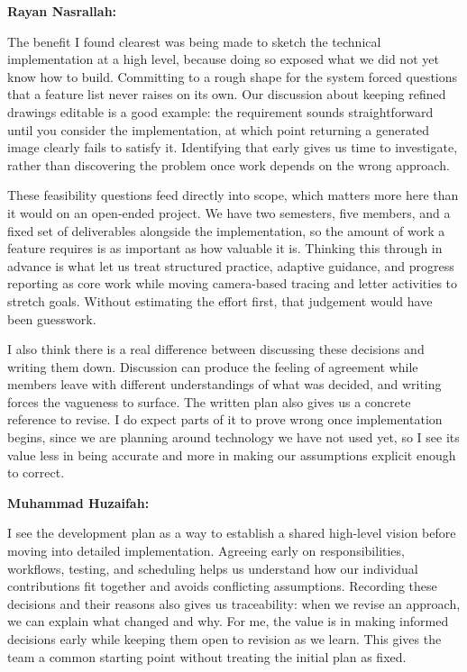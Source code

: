 \documentclass{article}
\begin{document}
\begin{enumerate}
    \textbf{Rayan Nasrallah:}

    The benefit I found clearest was being made to sketch the
    technical implementation at a high level, because doing so
    exposed what we did not yet know how to build. Committing to a
    rough shape for the system forced questions that a feature list
    never raises on its own.
    Our discussion about keeping refined drawings editable is a good
    example: the requirement sounds straightforward until you
    consider the implementation, at which point returning a
    generated image clearly fails to satisfy it. Identifying that
    early gives us time to investigate, rather than discovering the
    problem once work depends on the wrong approach.

    These feasibility questions feed directly into scope, which
    matters more here than it would on an open-ended project. We
    have two semesters, five members, and a fixed set of deliverables
    alongside the implementation, so the amount of work a feature
    requires is as important as how valuable it is. Thinking this
    through in advance is what let us treat structured practice,
    adaptive guidance, and progress reporting as core work while
    moving camera-based tracing and letter activities to stretch
    goals. Without estimating the effort first, that judgement would
    have been guesswork.

    I also think there is a real difference between discussing these
    decisions and writing them down. Discussion can produce the
    feeling of agreement while members leave with different
    understandings of what was decided, and writing forces the
    vagueness to surface. The written plan also gives us a concrete
    reference to revise. I do expect parts of it to prove wrong once
    implementation begins, since we are planning around technology
    we have not used yet, so I see its value less in being accurate
    and more in making our assumptions explicit enough to correct.

    \textbf{Muhammad Huzaifah:}

    I see the development plan as a way to establish a shared high-level
    vision before moving into detailed implementation. Agreeing early on
    responsibilities, workflows, testing, and scheduling helps us understand
    how our individual contributions fit together and avoids conflicting
    assumptions. Recording these decisions and their reasons also gives us
    traceability: when we revise an approach, we can explain what changed
    and why. For me, the value is in making informed decisions early while
    keeping them open to revision as we learn. This gives the team a common
    starting point without treating the initial plan as fixed.


\end{enumerate}
\end{document}
